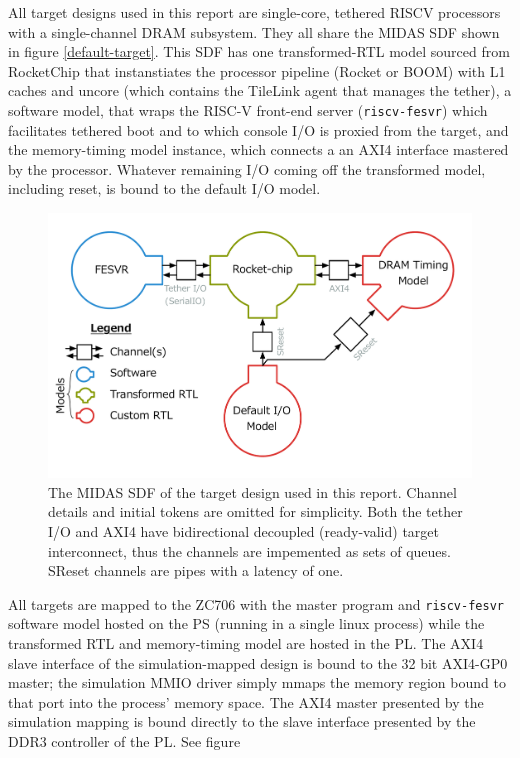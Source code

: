 All target designs used in this report are single-core, tethered RISCV
processors with a single-channel DRAM subsystem.  They all share the MIDAS SDF
shown in figure \ref{default-target}. This SDF has one transformed-RTL model
sourced from RocketChip that instanstiates the processor pipeline (Rocket or
BOOM) with L1 caches and uncore (which contains the TileLink agent that manages
the tether), a software model, that wraps the RISC-V front-end server
(\texttt{riscv-fesvr}) which facilitates tethered boot and to which console I/O
is proxied from the target, and the memory-timing model instance, which
connects a an AXI4 interface mastered by the processor. Whatever remaining I/O
coming off the transformed model, including reset, is bound to the default I/O
model.

\begin{figure}
	\centering
	\includegraphics[width=16cm]{figures/masters-target.pdf}
    \caption{The MIDAS SDF of the target design used in this report. Channel
    details and initial tokens are omitted for simplicity. Both the tether I/O
    and AXI4 have bidirectional decoupled (ready-valid) target interconnect,
    thus the channels are impemented as sets of queues. SReset channels are pipes with
    a latency of one.}
	\label{fig:default-target}
\end{figure}

All targets are mapped to the ZC706 with the master program and
\texttt{riscv-fesvr} software model hosted on the PS (running in a single linux
process) while the transformed RTL and memory-timing model are hosted in the
PL. The AXI4 slave interface of the simulation-mapped design is bound to the 32
bit AXI4-GP0 master; the simulation MMIO driver simply mmaps the memory region
bound to that port into the process' memory space.  The AXI4 master presented
by the simulation mapping is bound directly to the slave interface presented by
the DDR3 controller of the PL. See figure 
